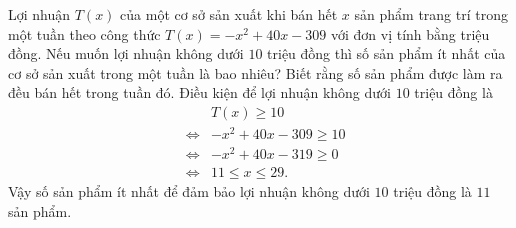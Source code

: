 \begin{ex}%
Lợi nhuận $T(x)$ của một cơ sở sản xuất khi bán hết $x$ sản phẩm trang trí trong một tuần theo công thức $T(x)=-x^2+40x-309$ với đơn vị tính bằng triệu đồng. Nếu muốn lợi nhuận không dưới $10$ triệu đồng thì số sản phẩm ít nhất của cơ sở sản xuất trong một tuần là bao nhiêu? Biết rằng số sản phẩm được làm ra đều bán hết trong tuần đó.
\loigiai
{
Điều kiện để lợi nhuận không dưới $10$ triệu đồng là
\begin{eqnarray*}
& & T(x) \geq 10\\
& \Leftrightarrow & -x^2+40x-309 \geq 10\\
& \Leftrightarrow & -x^2+40x-319 \geq 0\\
& \Leftrightarrow & 11 \leq x \leq 29.
\end{eqnarray*}
Vậy số sản phẩm ít nhất để đảm bảo lợi nhuận không dưới $10$ triệu đồng là $11$ sản phẩm.
}
\end{ex}